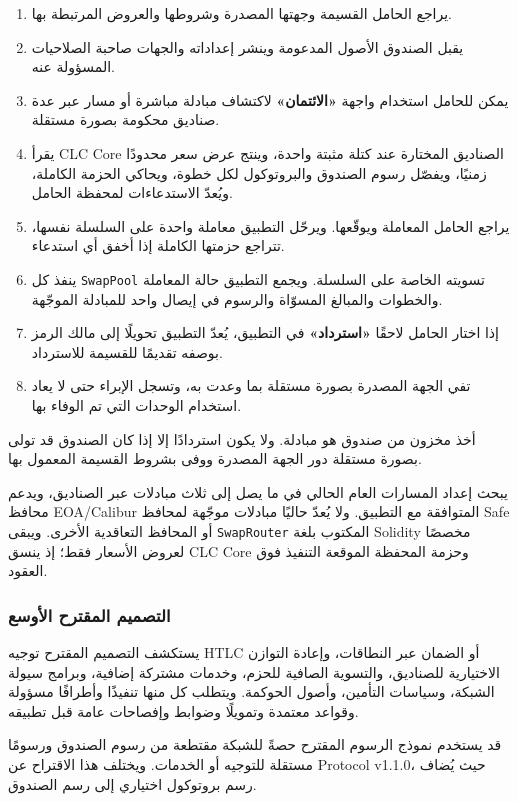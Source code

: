 \documentclass[11pt]{article}
\begin{document}
\begin{enumerate}[leftmargin=*]
\item يراجع الحامل القسيمة وجهتها المصدرة وشروطها والعروض المرتبطة بها.
\item يقبل الصندوق الأصول المدعومة وينشر إعداداته والجهات صاحبة الصلاحيات المسؤولة عنه.
\item يمكن للحامل استخدام واجهة \textbf{«الائتمان»} لاكتشاف مبادلة مباشرة أو مسار عبر عدة صناديق محكومة بصورة مستقلة.
\item يقرأ CLC Core الصناديق المختارة عند كتلة مثبتة واحدة، وينتج عرض سعر محدودًا زمنيًا، ويفصّل رسوم الصندوق والبروتوكول لكل خطوة، ويحاكي الحزمة الكاملة، ويُعدّ الاستدعاءات لمحفظة الحامل.
\item يراجع الحامل المعاملة ويوقّعها. ويرحّل التطبيق معاملة واحدة على السلسلة نفسها، تتراجع حزمتها الكاملة إذا أخفق أي استدعاء.
\item ينفذ كل \texttt{SwapPool} تسويته الخاصة على السلسلة. ويجمع التطبيق حالة المعاملة والخطوات والمبالغ المسوّاة والرسوم في إيصال واحد للمبادلة الموجّهة.
\item إذا اختار الحامل لاحقًا \textbf{«استرداد»} في التطبيق، يُعدّ التطبيق تحويلًا إلى مالك الرمز بوصفه تقديمًا للقسيمة للاسترداد.
\item تفي الجهة المصدرة بصورة مستقلة بما وعدت به، وتسجل الإبراء حتى لا يعاد استخدام الوحدات التي تم الوفاء بها.
\end{enumerate}
أخذ مخزون من صندوق هو مبادلة. ولا يكون استردادًا إلا إذا كان الصندوق قد تولى بصورة مستقلة دور الجهة المصدرة ووفى بشروط القسيمة المعمول بها.

يبحث إعداد المسارات العام الحالي في ما يصل إلى ثلاث مبادلات عبر الصناديق، ويدعم محافظ EOA/Calibur المتوافقة مع التطبيق. ولا يُعدّ حاليًا مبادلات موجّهة لمحافظ Safe أو المحافظ التعاقدية الأخرى. ويبقى \texttt{SwapRouter} المكتوب بلغة Solidity مخصصًا لعروض الأسعار فقط؛ إذ ينسق CLC Core وحزمة المحفظة الموقعة التنفيذ فوق العقود.

\subsubsection*{التصميم المقترح الأوسع}

يستكشف التصميم المقترح توجيه HTLC أو الضمان عبر النطاقات، وإعادة التوازن الاختيارية للصناديق، والتسوية الصافية للحزم، وخدمات مشتركة إضافية، وبرامج سيولة الشبكة، وسياسات التأمين، وأصول الحوكمة. ويتطلب كل منها تنفيذًا وأطرافًا مسؤولة وقواعد معتمدة وتمويلًا وضوابط وإفصاحات عامة قبل تطبيقه.

قد يستخدم نموذج الرسوم المقترح حصةً للشبكة مقتطعة من رسوم الصندوق ورسومًا مستقلة للتوجيه أو الخدمات. ويختلف هذا الاقتراح عن Protocol v1.1.0، حيث يُضاف رسم بروتوكول اختياري إلى رسم الصندوق.
\end{document}
